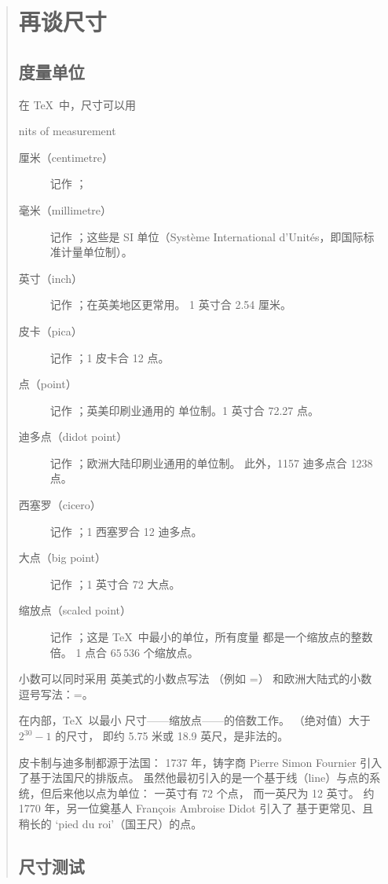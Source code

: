 \documentclass[a4paper]{rapport3}
\newenvironment{disp}{\begin{quotation}}{\end{quotation}}
\def\term#1\par{\index{#1}}
\begin{document}
\begin{disp}
\section{再谈尺寸}

\subsection{度量单位}

在 \TeX\ 中，尺寸可以用
\term units of measurement\par
\begin{description} \item [厘米（centimetre）]
    记作 ； 
\item [毫米（millimetre）]
	记作 ；这些是 SI 单位（{\italic Syst\`eme International
	d'Unit\'es}，即国际标准计量单位制）。
\item [英寸（inch）]
记作 ；在英美地区更常用。
1 英寸合 2.54 厘米。
\item [皮卡（pica）]
    记作 ；1 皮卡合 12 点。
\item [点（point）]
    记作 ；英美印刷业通用的
单位制。1 英寸合 72.27 点。
\item [迪多点（didot point）]
    记作 ；欧洲大陆印刷业通用的单位制。
    此外，1157 迪多点合 1238 点。
\item [西塞罗（cicero）]
    记作 ；1 西塞罗合 12 迪多点。
\item [大点（big point）]
    记作 ；1 英寸合 72 大点。
\item [缩放点（scaled point）]
    记作 ；这是 \TeX\ 中最小的单位，所有度量
    都是一个缩放点的整数倍。
    1 点合 $65\,536$ 个缩放点。
\end{description}

小数可以同时采用
英美式的小数点写法
（例如 \n{1in}=\n{72.27pt}）
和欧洲大陆式的小数
逗号写法：\n{1in}=。

在内部，\TeX\ 以最小
尺寸——缩放点——的倍数工作。
（绝对值）大于 $2^{30}-1$ 的尺寸，
即约 5.75 米或 18.9 英尺，是非法的。

皮卡制与迪多制都源于法国：
1737 年，铸字商 Pierre Simon Fournier
引入了基于法国尺的排版点。
虽然他最初引入的是一个基于线（line）与点的系统，但后来他以点为单位：
一英寸有 72 个点，
而一英尺为 12 英寸。
约 1770 年，另一位奠基人 Fran\c{c}ois Ambroise Didot 引入了
基于更常见、且稍长的 `pied du roi'（国王尺）的点。

\subsection{尺寸测试}


\end{disp}
\end{document}
